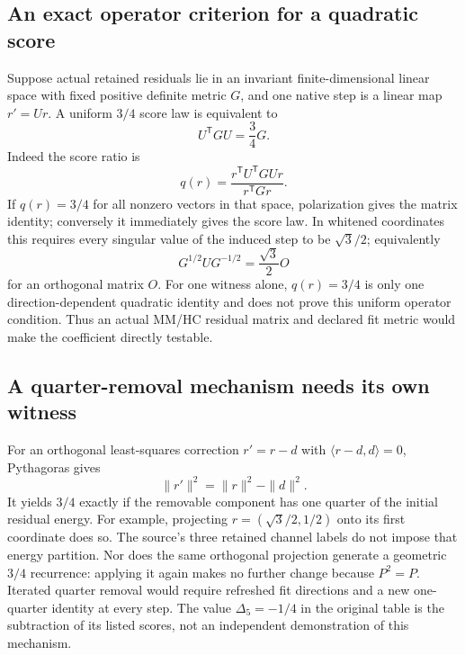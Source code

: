 \documentclass[11pt,a4paper]{article}
\begin{document}
\subsection{An exact operator criterion for a quadratic score}
Suppose actual retained residuals lie in an invariant finite-dimensional
linear space with fixed positive definite metric $G$, and one native step
is a linear map $r'=Ur$. A uniform $3/4$ score law is equivalent to
\[
U^{\mathsf T}GU=\frac34G.
\]
Indeed the score ratio is
\[
q(r)=\frac{r^{\mathsf T}U^{\mathsf T}GU r}{r^{\mathsf T}Gr}.
\]
If $q(r)=3/4$ for all nonzero vectors in that space, polarization gives
the matrix identity; conversely it immediately gives the score law.
In whitened coordinates this requires every singular value of the
induced step to be $\sqrt3/2$; equivalently
\[
G^{1/2}UG^{-1/2}=\frac{\sqrt3}{2}O
\]
for an orthogonal matrix $O$. For one witness alone, $q(r)=3/4$ is only
one direction-dependent quadratic identity and does not prove this
uniform operator condition. Thus an actual MM/HC residual matrix and
declared fit metric would make the coefficient directly testable.

\subsection{A quarter-removal mechanism needs its own witness}
For an orthogonal least-squares correction $r'=r-d$ with
$\langle r-d,d\rangle=0$, Pythagoras gives
\[
\|r'\|^2=\|r\|^2-\|d\|^2.
\]
It yields $3/4$ exactly if the removable component has one quarter of
the initial residual energy. For example, projecting
$r=(\sqrt3/2,1/2)$ onto its first coordinate does so.
The source's three retained channel labels do not impose that energy
partition. Nor does the same orthogonal projection generate a geometric
$3/4$ recurrence: applying it again makes no further change because
$P^2=P$. Iterated quarter removal would require refreshed fit directions
and a new one-quarter identity at every step.
The value $\Delta_5=-1/4$ in the original table is the subtraction of
its listed scores, not an independent demonstration of this mechanism.
\end{document}
